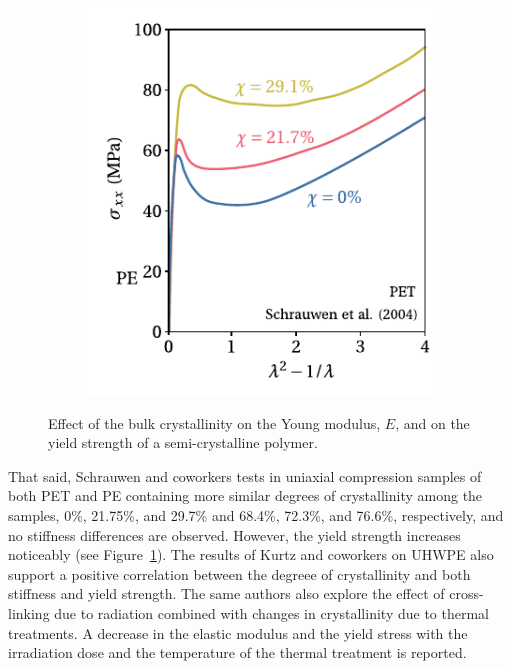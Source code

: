 \begin{figure}[hbtp]
\begin{subfigure}[b]{0.45\textwidth}
                            \includegraphics[width=\textwidth]{figures/deg_cryst_yield}
                            \caption{}
                            \label{subfig:deg_cryst_yield}
            \end{subfigure}
  \caption{Effect of the bulk crystallinity on  the Young modulus, $E$, and on the  yield strength of a semi-crystalline polymer.}
\label{fig:deg_cryst_stiff_yield}
\end{figure}
That said, Schrauwen and coworkers \citep{schrauwenIntrinsicDeformationBehavior2004} tests in uniaxial compression samples of both PET and PE containing more similar degrees of crystallinity among the samples, 0\%, 21.75\%, and 29.7\% and 68.4\%, 72.3\%, and 76.6\%, respectively, and no stiffness differences are observed.
However, the yield strength increases noticeably (see Figure~\ref{subfig:deg_cryst_yield}).
The results of Kurtz and coworkers \citep{kurtzThermomechanicalBehaviorVirgin2002} on UHWPE also support a positive correlation between the degreee of crystallinity and both stiffness and yield strength.
The same authors \citep{kurtzMiniatureSpecimenMechanical1999, kurtzThermomechanicalBehaviorVirgin2002} also explore the effect of cross-linking due to radiation combined with changes in crystallinity due to thermal treatments.
A decrease in the elastic modulus and the yield stress with the irradiation dose and the temperature of the thermal treatment is reported.

